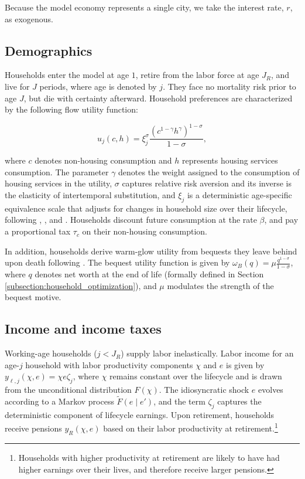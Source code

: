 \documentclass[parskip=full]{article}
\begin{document}
Because the model economy represents a single city, we take the interest rate, $r$, as exogenous. 

\subsection{Demographics}\label{subsection:demographics}

Households enter the model at age $1$, retire from the labor force at age $J_{R}$, and live for $J$ periods, where age is denoted by $j$. They face no mortality risk prior to age $J$, but die with certainty afterward. Household preferences are characterized by the following flow utility function:

\begin{equation*}
    u_{j}(c,h)=\xi_{j}^{\sigma}\frac{\left(c^{1-\gamma} h^{\gamma}\right)^{1-\sigma}}{1-\sigma},
\end{equation*}

\noindent where $c$ denotes non-housing consumption and $h$ represents housing services consumption. The parameter $\gamma$ denotes the weight assigned to the consumption of housing services in the utility, $\sigma$ captures relative risk aversion and its inverse is the elasticity of intertemporal substitution, and $\xi_{j}$ is a deterministic age-specific equivalence scale that adjusts for changes in household size over their lifecycle, following \citet{lm-1980}, \citet{wz-2010}, and \citet{xu-2013}. Households discount future consumption at the rate $\beta$, and pay a proportional tax $\tau_{c}$ on their non-housing consumption.

In addition, households derive warm-glow utility from bequests they leave behind upon death following \citet{cagetti-denardi-2006}. The bequest utility function is given by $\omega_{B}(q)=\mu \frac{q^{1-\sigma}}{1-\sigma}$, where $q$ denotes net worth at the end of life (formally defined in Section \ref{subsection:household_optimization}), and $\mu$ modulates the strength of the bequest motive.

\subsection{Income and income taxes}\label{subsection:income}

Working-age households ($j<J_{R}$) supply labor inelastically. Labor income for an age-$j$ household with labor productivity components $\chi$ and $e$ is given by $y_{\ell,j}(\chi,e)=\chi e\zeta_j$, where $\chi$ remains constant over the lifecycle and is drawn from the unconditional distribution $\hat{F}(\chi)$. The idiosyncratic shock $e$ evolves according to a Markov process $\tilde{F}(e \mid e')$, and the term $\zeta_j$ captures the deterministic component of lifecycle earnings. Upon retirement, households receive pensions $y_{R}(\chi,e)$ based on their labor productivity at retirement.\footnote{Households with higher productivity at retirement are likely to have had higher earnings over their lives, and therefore receive larger pensions.}
\end{document}
